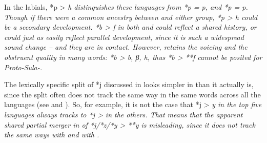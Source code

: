 In the labials,  *p > \it{h} distinguishes these
languages from  *p = \it{p},
and  *p = \it{p}.
Though if there were a common ancestry between 
and either group, *p > \it{h} could be a secondary development.
*b > \it{f} in both 
and  could reflect a shared history,
or could just as easily reflect parallel development,
since it is such a widespread sound change -- and they are in contact.
However,  retains the voicing
and the obstruent quality in many words: *b > \it{b,
β, h}, thus *b > **f cannot be posited for Proto-Sula-.

The lexically specific split of *j discussed in  looks
simpler in  than it actually is,
since the split often does not track the same way in the same
words across all the languages (see  and ).
So, for example, it is not the case that *j > \it{y} in the top
five languages always tracks to *j > {\0} in the others.
That means that the apparent shared partial merger in 
of *j/*z/*y > **y is misleading,
since it does not track the same ways with  and with .


